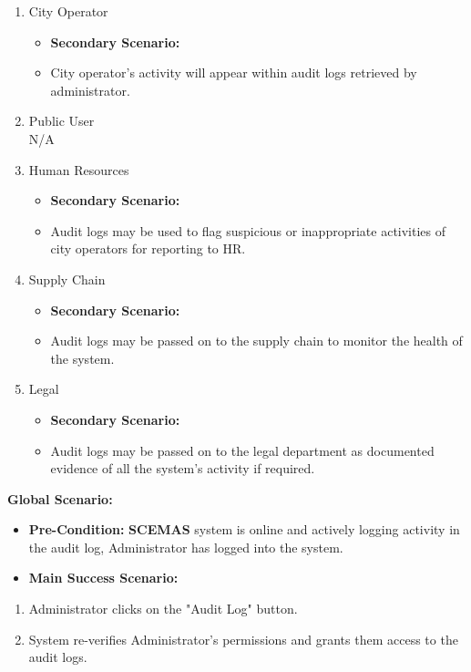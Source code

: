 \documentclass[]{article}
\begin{document}
\begin{enumerate}[{\bf BE1.}]
\begin{enumerate}[{\bf VP1.}]
\begin{itemize}
				\hspace{1cm}5ii.2. Checking audit log fails.
			\end{itemize}
		\item City Operator
			\begin{itemize}
				\item[] {\bf Secondary Scenario:}
				\item[5i.] City operator's activity will appear within audit logs retrieved by administrator.
			\end{itemize}
		\item Public User \\
			N/A
		\item Human Resources
			\begin{itemize}
				\item[] {\bf Secondary Scenario:}
				\item[6i.] Audit logs may be used to flag suspicious or inappropriate activities of city operators for reporting to HR.
			\end{itemize}
		\item Supply Chain
			\begin{itemize}
				\item[] {\bf Secondary Scenario:}
				\item[6i.] Audit logs may be passed on to the supply chain to monitor the health of the system.
			\end{itemize}
		\item Legal
			\begin{itemize}
				\item[] {\bf Secondary Scenario:}
				\item[6i.] Audit logs may be passed on to the legal department as documented evidence of all the system's activity if required.
			\end{itemize}
		\end{enumerate}
		{\bf Global Scenario:}
		\begin{itemize}
			\item[] {\bf Pre-Condition:} \textbf{SCEMAS} system is online and actively logging activity in the audit log, Administrator has logged into the system.
			\item[] {\bf Main Success Scenario:}
		\end{itemize}
		\begin{enumerate}[1.]
			\item Administrator clicks on the "Audit Log" button.
			\item System re-verifies Administrator's permissions and grants them access to the audit logs.

\end{enumerate}
\end{enumerate}
\end{document}
